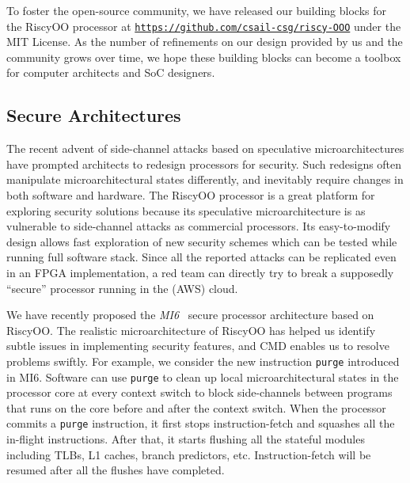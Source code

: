 \documentclass[conference]{IEEEtran}
\newcommand{\flushInst}{\texttt{purge}\xspace}
\begin{document}
To foster the open-source community, we have released our building blocks for the RiscyOO processor at \texttt{\url{https://github.com/csail-csg/riscy-OOO}} under the MIT License.
As the number of refinements on our design provided by us and the community grows over time, we hope these building blocks can become a toolbox for computer architects and SoC designers.

\subsection{Secure Architectures}
The recent advent of side-channel attacks based on speculative microarchitectures have prompted architects to redesign processors for security.
Such redesigns often manipulate microarchitectural states differently, and inevitably require changes in both software and hardware.
The RiscyOO processor is a great platform for exploring security solutions because its speculative microarchitecture is as vulnerable to side-channel attacks as commercial processors.
Its easy-to-modify design allows fast exploration of new security schemes which can be tested while running full software stack.
Since all the reported attacks can be replicated even in an FPGA implementation, a red team can directly try to break a supposedly ``secure'' processor running in the (AWS) cloud.

We have recently proposed the \emph{MI6}~\cite{mi6} secure processor architecture based on RiscyOO.
The realistic microarchitecture of RiscyOO has helped us identify subtle issues in implementing security features, and CMD enables us to resolve problems swiftly.
For example, we consider the new instruction \flushInst{} introduced in MI6.
Software can use \flushInst{} to clean up local microarchitectural states in the processor core at every context switch to block side-channels between programs that runs on the core before and after the context switch.
When the processor commits a \flushInst{} instruction, it first stops instruction-fetch and squashes all the in-flight instructions.
After that, it starts flushing all the stateful modules including TLBs, L1 caches, branch predictors, etc.
Instruction-fetch will be resumed after all the flushes have completed.
\end{document}

